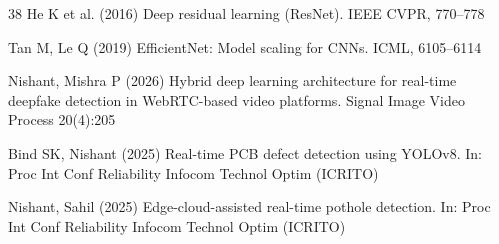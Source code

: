 \documentclass[default, iicol]{sn-jnl}
\theoremstyle{thmstyleone}%
\theoremstyle{thmstyletwo}%
\theoremstyle{thmstylethree}%
\begin{document}
\begin{thebibliography}{38}
He K et al. (2016) Deep residual learning (ResNet). IEEE CVPR, 770–778

Tan M, Le Q (2019) EfficientNet: Model scaling for CNNs. ICML, 6105–6114


Nishant, Mishra P (2026) Hybrid deep learning architecture for real-time deepfake detection in WebRTC-based video platforms. Signal Image Video Process 20(4):205

Bind SK, Nishant (2025) Real-time PCB defect detection using YOLOv8. In: Proc Int Conf Reliability Infocom Technol Optim (ICRITO)

Nishant, Sahil (2025) Edge-cloud-assisted real-time pothole detection. In: Proc Int Conf Reliability Infocom Technol Optim (ICRITO)

\end{thebibliography}
\end{document}
